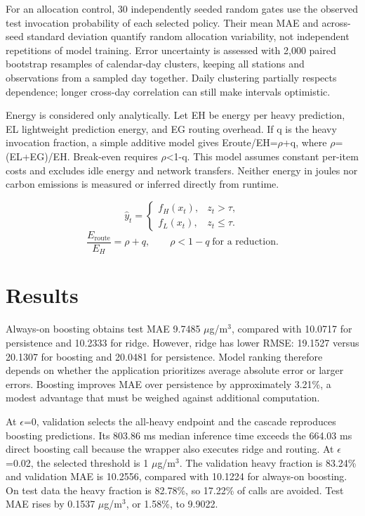 \documentclass[conference,a4paper]{IEEEtran}
\begin{document}
For an allocation control, 30 independently seeded random gates use the observed test invocation probability of each selected policy. Their mean MAE and across-seed standard deviation quantify random allocation variability, not independent repetitions of model training. Error uncertainty is assessed with 2,000 paired bootstrap resamples of calendar-day clusters, keeping all stations and observations from a sampled day together. Daily clustering partially respects dependence; longer cross-day correlation can still make intervals optimistic.

Energy is considered only analytically. Let EH be energy per heavy prediction, EL lightweight prediction energy, and EG routing overhead. If q is the heavy invocation fraction, a simple additive model gives Eroute/EH=$\rho$+q, where $\rho$=(EL+EG)/EH. Break-even requires $\rho$<1-q. This model assumes constant per-item costs and excludes idle energy and network transfers. Neither energy in joules nor carbon emissions is measured or inferred directly from runtime.

\begin{equation}\hat{y}_t=\begin{cases}f_H(x_t),& z_t>\tau,\\f_L(x_t),&z_t\leq\tau.\end{cases}\end{equation}
\begin{equation}\frac{E_{\mathrm{route}}}{E_H}=\rho+q,\qquad \rho<1-q\;\text{for a reduction}.\end{equation}
\section{Results}
Always-on boosting obtains test MAE 9.7485 $\mu$g/m$^3$, compared with 10.0717 for persistence and 10.2333 for ridge. However, ridge has lower RMSE: 19.1527 versus 20.1307 for boosting and 20.0481 for persistence. Model ranking therefore depends on whether the application prioritizes average absolute error or larger errors. Boosting improves MAE over persistence by approximately 3.21\%, a modest advantage that must be weighed against additional computation.

At $\epsilon$=0, validation selects the all-heavy endpoint and the cascade reproduces boosting predictions. Its 803.86 ms median inference time exceeds the 664.03 ms direct boosting call because the wrapper also executes ridge and routing. At $\epsilon$=0.02, the selected threshold is 1 $\mu$g/m$^3$. The validation heavy fraction is 83.24\% and validation MAE is 10.2556, compared with 10.1224 for always-on boosting. On test data the heavy fraction is 82.78\%, so 17.22\% of calls are avoided. Test MAE rises by 0.1537 $\mu$g/m$^3$, or 1.58\%, to 9.9022.
\end{document}
